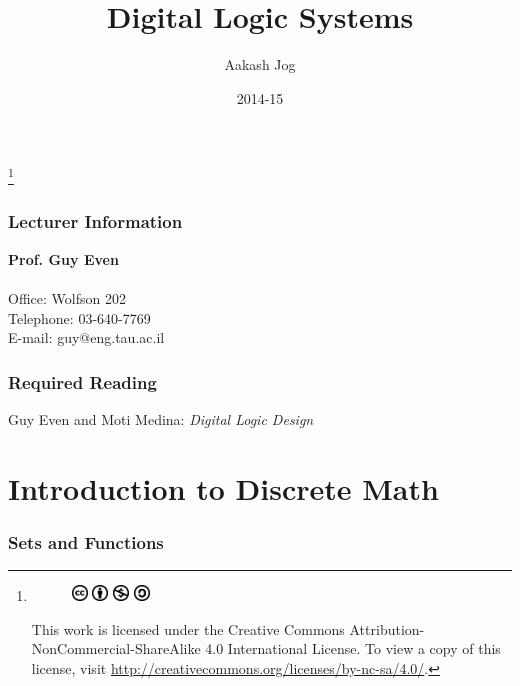 \documentclass[fleqn, a4paper, 12pt, twoside]{article}
\title{Digital Logic Systems}
\author{Aakash Jog}
\date{2014-15}
\theoremstyle{definition}
\theoremstyle{theorem}
\newcommand\blfootnote[1]{%
	\begingroup
	\renewcommand\thefootnote{}\footnote{#1}%
	\addtocounter{footnote}{-1}%
	\endgroup
}
\begin{document}
\maketitle

\blfootnote
{	
	\begin{figure}[H]
		\includegraphics[height = 12pt]{cc.eps}
		\includegraphics[height = 12pt]{by.eps}
		\includegraphics[height = 12pt]{nc.eps}
		\includegraphics[height = 12pt]{sa.eps}
	\end{figure}
	This work is licensed under the Creative Commons Attribution-NonCommercial-ShareAlike 4.0 International License. To view a copy of this license, visit \url{http://creativecommons.org/licenses/by-nc-sa/4.0/}.
}

\tableofcontents

\newpage
\section{Lecturer Information}

\textbf{Prof. Guy Even}\\
~\\
Office: Wolfson 202\\
Telephone: 03-640-7769\\
E-mail: guy@eng.tau.ac.il\\

\section{Required Reading}

Guy Even and Moti Medina: \textit{Digital Logic Design}

\newpage
\part{Introduction to Discrete Math}

\section{Sets and Functions}
\end{document}
